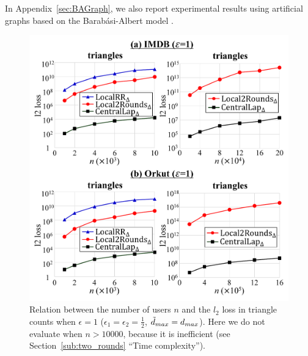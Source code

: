 In Appendix~\ref{sec:BAGraph}, 
we also report experimental results using artificial graphs based on the Barab\'{a}si-Albert model \cite{NetworkScience}.

\begin{figure}[t]
\centering
\includegraphics[width=0.99\linewidth]{fig/res1_n_l2loss_tri.pdf}
\vspace{-4mm}
\caption{Relation between the number of users $n$ and the $l_2$ loss in triangle counts when $\epsilon = 1$ ($\epsilon_1 = \epsilon_2 = \frac{1}{2}$, $\tilde{d}_{max} = d_{max}$). 
Here we do not evaluate  when $n > 10000$, because it is inefficient (see Section~\ref{sub:two_rounds} ``Time complexity'').}
\label{fig:res1_n_l2loss_tri}
\end{figure}

